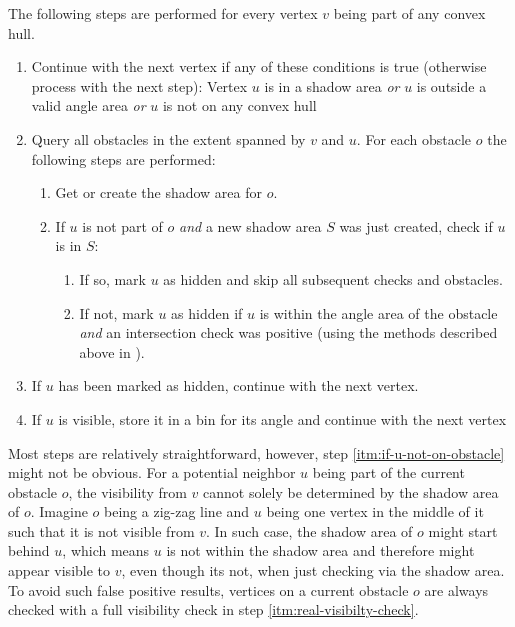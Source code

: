 			The following steps are performed for every vertex $v$ being part of any convex hull.
			\begin{enumerate}[leftmargin=2.25em+\widthof{2.2.},label={2.2.\arabic*.}]
				\item Continue with the next vertex if any of these conditions is true (otherwise process with the next step): Vertex $u$ is in a shadow area \emph{or} $u$ is outside a valid angle area \emph{or} $u$ is not on any convex hull
				\item Query all obstacles in the extent spanned by $v$ and $u$. For each obstacle $o$ the following steps are performed:
				\begin{enumerate}[leftmargin=2.25em+\widthof{2.2.}-1em]
					\item Get or create the shadow area for $o$.
					\item If $u$ is not part of $o$ \emph{and} a new shadow area $S$ was just created, check if $u$ is in $S$:\label{itm:if-u-not-on-obstacle}
					\begin{enumerate}[leftmargin=2.25em+\widthof{2.2.}-2em]
						\item If so, mark $u$ as hidden and skip all subsequent checks and obstacles.
						\item If not, mark $u$ as hidden if $u$ is within the angle area of the obstacle \emph{and} an intersection check was positive (using the methods described above in \emph{}).\label{itm:real-visibilty-check}
					\end{enumerate}
				\end{enumerate}
				\item If $u$ has been marked as hidden, continue with the next vertex.
				\item If $u$ is visible, store it in a bin for its angle and continue with the next vertex
			\end{enumerate}
			Most steps are relatively straightforward, however, step \ref{itm:if-u-not-on-obstacle} might not be obvious.
			For a potential neighbor $u$ being part of the current obstacle $o$, the visibility from $v$ cannot solely be determined by the shadow area of $o$.
			Imagine $o$ being a zig-zag line and $u$ being one vertex in the middle of it such that it is not visible from $v$.
			In such case, the shadow area of $o$ might start behind $u$, which means $u$ is not within the shadow area and therefore might appear visible to $v$, even though its not, when just checking via the shadow area.
			To avoid such false positive results, vertices on a current obstacle $o$ are always checked with a full visibility check in step \ref{itm:real-visibilty-check}.
		
